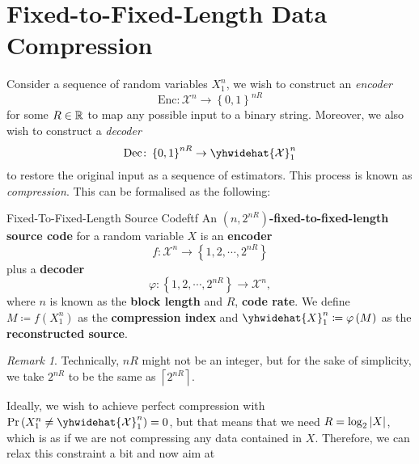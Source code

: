 \documentclass[math]{amznotes}
\theoremstyle{remark}
\newtheorem*{remark}{Remark}
\begin{document}
\section{Fixed-to-Fixed-Length Data Compression}
Consider a sequence of random variables $X_1^n$, we wish to construct an \textit{encoder} 
\begin{equation*}
    \mathrm{Enc} \colon \mathcal{X}^n \to \left\{0, 1\right\}^{nR}
\end{equation*}
for some $R \in \mathbb{R}$ to map any possible input to a binary string. Moreover, we also wish to construct a \textit{decoder}
\begin{equation*}
    \mathrm{Dec} \colon \left\{0, 1\right\}^{nR} \to \yhwidehat{\mathcal{X}}_1^n
\end{equation*}
to restore the original input as a sequence of estimators. This process is known as \textit{compression}. This can be formalised as the following:
\begin{dfnbox}{Fixed-To-Fixed-Length Source Code}{ftf}
    An {\color{red} \textbf{$\left(n, 2^{nR}\right)$-fixed-to-fixed-length source code}} for a random variable $X$ is an {\color{red} \textbf{encoder}}
    \begin{equation*}
        f \colon \mathcal{X}^n \to \left\{1, 2, \cdots, 2^{nR}\right\}
    \end{equation*}
    plus a {\color{red} \textbf{decoder}}
    \begin{equation*}
        \varphi \colon \left\{1, 2, \cdots, 2^{nR}\right\} \to \mathcal{X}^n,
    \end{equation*}
    where $n$ is known as the {\color{red} \textbf{block length}} and $R$, {\color{red} \textbf{code rate}}. We define $M \coloneqq f\left(X_1^n\right)$ as the {\color{red} \textbf{compression index}} and $\yhwidehat{X}_1^n \coloneqq \varphi\left(M\right)$ as the {\color{red} \textbf{reconstructed source}}.
\end{dfnbox}
\begin{notebox}
    \begin{remark}
        Technically, $nR$ might not be an integer, but for the sake of simplicity, we take $2^{nR}$ to be the same as $\left\lceil 2^{nR}\right\rceil$.
    \end{remark}
\end{notebox}
Ideally, we wish to achieve perfect compression with $\Pr\left(X_1^n \neq \yhwidehat{\mathcal{X}}_1^n\right) = 0$, but that means that we need $R = \log_2{\left\lvert {X} \right\rvert}$, which is as if we are not compressing any data contained in $X$. Therefore, we can relax this constraint a bit and now aim at 
\end{document}
